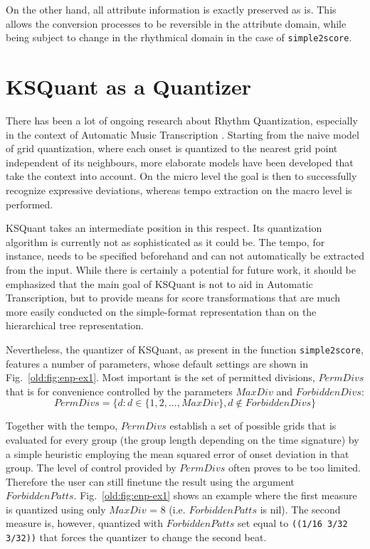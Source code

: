\documentclass[runningheads,a4paper]{llncs}
\begin{document}
On the other hand, all attribute information is exactly preserved as
is. This allows the conversion processes to be reversible in the
attribute domain, while being subject to change in the rhythmical
domain in the case of \texttt{simple2score}.

\section{KSQuant  as a Quantizer}\label{old:KSQuant Quantitizer}
There has been a lot of ongoing research about Rhythm Quantization,
especially in the context of Automatic Music Transcription
\cite{agon}.  Starting from the naive model of grid
quantization, where each onset is quantized to the nearest grid point
independent of its neighbours, more elaborate models have been
developed that take the context into account. On the micro level the
goal is then to successfully recognize expressive deviations, whereas
tempo extraction on the macro level is performed.

KSQuant takes an intermediate position in this respect. Its
quantization algorithm is currently not as sophisticated as it could
be. The tempo, for instance, needs to be specified beforehand and can
not automatically be extracted from the input.  While there is
certainly a potential for future work, it should be emphasized that
the main goal of KSQuant is not to aid in Automatic Transcription, but
to provide means for score transformations that are much more easily
conducted on the simple-format representation than on the hierarchical
tree representation.

Nevertheless, the quantizer of KSQuant, as present in the function
\texttt{simple2score}, features a number of parameters, whose default
settings are shown in Fig.~\ref{old:fig:enp-ex1}.  Most important
is the set of permitted divisions, $PermDivs$ that is for convenience
controlled by the parameters $MaxDiv$ and $ForbiddenDivs$:
$$PermDivs = \{d:d \in \{1,2, ..., MaxDiv \}, d \notin ForbiddenDivs\}$$

Together with the tempo, $PermDivs$ establish a set of possible grids
that is evaluated for every group (the group length depending on the
time signature) by a simple heuristic employing the mean squared error
of onset deviation in that group.  The level of control provided by
$PermDivs$ often proves to be too limited. Therefore the user can
still finetune the result using the argument
$ForbiddenPatts$. Fig.~\ref{old:fig:enp-ex1} shows an example where the first
measure is quantized using only $MaxDiv$ = 8 (i.e. $ForbiddenPatts$ is
nil). The second measure is, however, quantized with $ForbiddenPatts$
set equal to \texttt{((1/16 3/32 3/32))} that forces the quantizer to
change the second beat.
\end{document}
